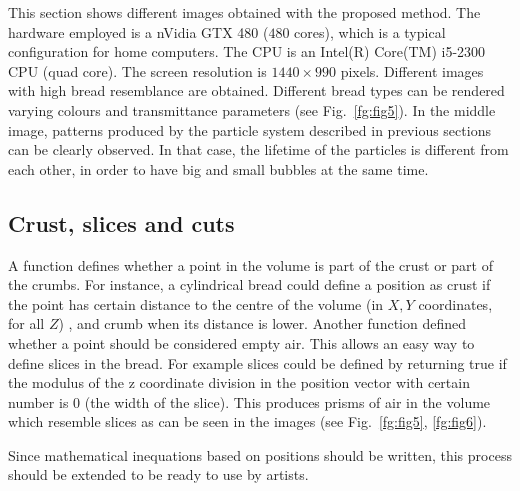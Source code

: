 \documentclass[oneside,a4paper,english,links]{amca}
\begin{document}
This section shows different images obtained with the proposed
method. The hardware employed is a nVidia GTX 480 ($480$ cores), which
is a typical configuration for home computers. The CPU is an Intel(R)
Core(TM) i5-2300 CPU (quad core). The screen resolution is
$1440\times990$ pixels. Different images with high bread resemblance
are obtained. Different bread types can be rendered varying colours
and transmittance parameters (see Fig.~\ref{fg:fig5}). In the middle
image, patterns produced by the particle system described in previous
sections can be clearly observed. In that case, the lifetime of the
particles is different from each other, in order to have big and small
bubbles at the same time. 

\subsection{Crust, slices and cuts}

A function defines whether a point in the volume is part of the crust
or part of the crumbs. For instance, a cylindrical bread could define
a position as crust if the point has certain distance to the centre of
the volume (in $X,Y$ coordinates, for all $Z$) , and crumb when its
distance is lower. Another function defined whether a point should be
considered empty air. This allows an easy way to define slices in the
bread. For example slices could be defined by returning true if the
modulus of the z coordinate division in the position vector with
certain number is $0$ (the width of the slice).  This produces prisms
of air in the volume which resemble slices as can be seen in the
images (see Fig.~\ref{fg:fig5}, \ref{fg:fig6}).

Since mathematical inequations based on positions should be written, this process should be extended to be ready to use by artists.
\end{document}
